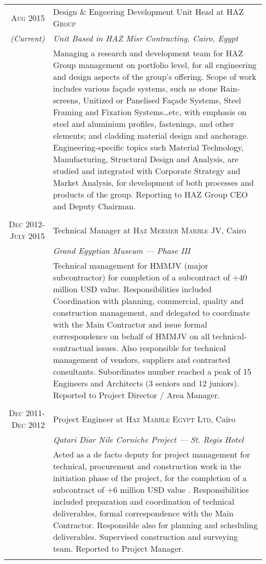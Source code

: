 \documentclass[a4paper,11pt]{article} %
\begin{document}
\begin{tabular}{r|p{11cm}}

\textsc{Aug 2015} & Design \& Engeering Development Unit Head at \textsc{HAZ Group}\\
\emph{(Current)} & \emph{Unit Based in HAZ Misr Contracting, Cairo, Egypt} \\
& \footnotesize{Managing a research and development team for HAZ Group management on portfolio level, for all engineering and design aspects of the group's offering. Scope of work includes various fa\c{c}ade systems, such as stone Rain-screens, Unitized or Panelised Fa\c{c}ade Systems, Steel Framing and Fixation Systems\ldots etc, with emphasis on steel and aluminium  profiles, fastenings, and other elements; and cladding material design and anchorage. Engineering-specific topics such Material Technology, Manufacturing, Structural Design and Analysis, are studied and integrated with Corporate Strategy and Market Analysis, for development of both processes and products of the group. Reporting to HAZ Group CEO and Deputy Chairman.}\\
\multicolumn{2}{c}{} \\



\textsc{Dec 2012-July 2015} & Technical Manager at \textsc{Haz Mermer Marble JV}, Cairo\\
& \emph{Grand Egyptian Museum --- Phase III}\\ 
& \footnotesize{Technical management for HMMJV (major subcontractor) for completion of a subcontract of +40 million USD value. Responsibilities included Coordination with planning, commercial, quality and construction management, and delegated to coordinate with the Main Contractor and issue formal correspondence on behalf of HMMJV on all technical-contractual issues. Also responsible for technical management of vendors, suppliers and contracted consultants. Subordinates number reached a peak of 15 Engineers and Architects (3 seniors and 12 juniors). Reported to Project Director / Area Manager.}\\
\multicolumn{2}{c}{} \\


\textsc{Dec 2011-Dec 2012} & Project Engineer at \textsc{Haz Marble Egypt Ltd}, Cairo \\
& \emph{Qatari Diar Nile Corniche Project --- St. Regis Hotel} \\
& \footnotesize{Acted as a de facto deputy for project management for technical, procurement and construction work in the initiation phase of the project, for the completion of a subcontract of +6 million USD value . Responsibilities included preparation and coordination of technical deliverables, formal correspondence with the Main Contractor. Responsible also for planning and scheduling deliverables. Supervised construction and surveying team. Reported to Project Manager.}\\
\multicolumn{2}{c}{} \\


\end{tabular}
\end{document}

